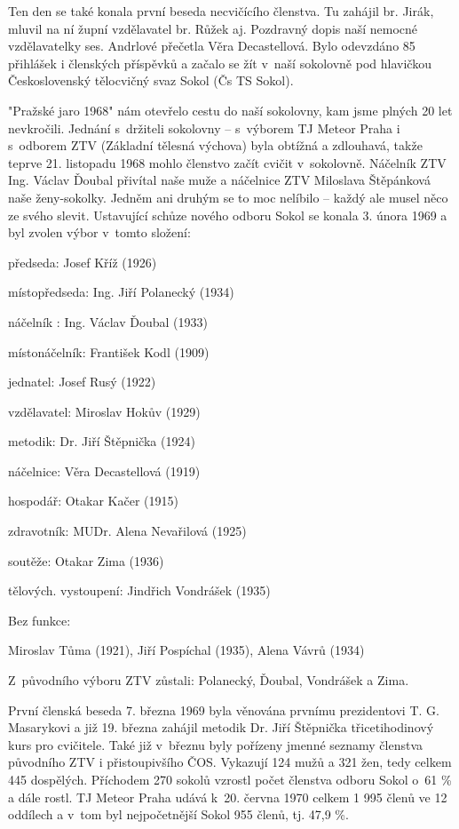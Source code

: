 \documentclass[a5paper, 12pt, twoside]{article}
\begin{document}
Ten den se také konala první beseda necvičícího členstva. Tu zahájil br.
Jirák, mluvil na ní župní vzdělavatel br. Růžek aj. Pozdravný dopis naší
nemocné vzdělavatelky ses. Andrlové přečetla Věra Decastellová. Bylo
odevzdáno 85 přihlášek i členských příspěvků a začalo se žít v~naší
sokolovně pod hlavičkou Československý tělocvičný svaz Sokol (Čs TS
Sokol).

"Pražské jaro 1968" nám otevřelo cestu do naší sokolovny, kam jsme
plných 20 let nevkročili. Jednání s~držiteli sokolovny -- s~výborem TJ
Meteor Praha i s~odborem ZTV (Základní tělesná výchova) byla obtížná a
zdlouhavá, takže teprve 21. listopadu 1968 mohlo členstvo začít cvičit
v~sokolovně. Náčelník ZTV Ing. Václav Ďoubal přivítal naše muže a
náčelnice ZTV Miloslava Štěpánková naše ženy-sokolky. Jedněm ani druhým
se to moc nelíbilo -- každý ale musel něco ze svého slevit. Ustavující
schůze nového odboru Sokol se konala 3. února 1969 a byl zvolen výbor
v~tomto složení:

předseda: Josef Kříž (1926)

místopředseda: Ing. Jiří Polanecký (1934)

náčelník : Ing. Václav Ďoubal (1933)

místonáčelník: František Kodl (1909)

jednatel: Josef Rusý (1922)

vzdělavatel: Miroslav Hokův (1929)

metodik: Dr. Jiří Štěpnička (1924)

náčelnice: Věra Decastellová (1919)

hospodář: Otakar Kačer (1915)

zdravotník: MUDr. Alena Nevařilová (1925)

soutěže: Otakar Zima (1936)

tělových. vystoupení: Jindřich Vondrášek (1935)

Bez funkce:

Miroslav Tůma (1921), Jiří Pospíchal (1935), Alena Vávrů (1934)

Z~původního výboru ZTV zůstali: Polanecký, Ďoubal, Vondrášek a Zima.

První členská beseda 7. března 1969 byla věnována prvnímu prezidentovi
T. G. Masarykovi a již 19. března zahájil metodik Dr. Jiří Štěpnička
třicetihodinový kurs pro cvičitele. Také již v~březnu byly pořízeny
jmenné seznamy členstva původního ZTV i přistoupivšího ČOS. Vykazují 124
mužů a 321 žen, tedy celkem 445 dospělých. Příchodem 270 sokolů vzrostl
počet členstva odboru Sokol o~61 \% a dále rostl. TJ Meteor Praha udává
k~20. června 1970 celkem 1 995 členů ve 12 oddílech a v~tom byl
nejpočetnější Sokol 955 členů, tj. 47,9 \%.
\end{document}
